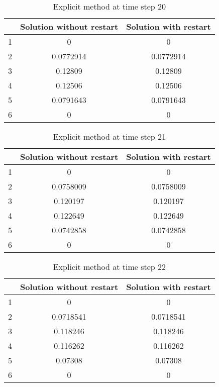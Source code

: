 \documentclass[a4paper,12pt]{article}
\begin{document}
\begin{table}[H]
\begin{center}
\begin{tabular}{ | c | c | c | }
  \hline
  & Solution without restart & Solution with restart \\
 \hline
 1  &  0 & 0     \\
  \hline
 2  &  0.0772914 & 0.0772914   \\
  \hline
 3  &  0.12809 & 0.12809   \\
  \hline
 4  &  0.12506 & 0.12506   \\
  \hline
 5  &   0.0791643 & 0.0791643   \\
  \hline
 6  &   0 & 0   \\
  \hline
\end{tabular}
\end{center}
\caption{Explicit method at time step 20}
\end{table}

\begin{table}[H]
\begin{center}
\begin{tabular}{ | c | c | c | }
  \hline
  & Solution without restart & Solution with restart \\
 \hline
 1  &  0 &  0  \\
  \hline
 2  &  0.0758009 &  0.0758009  \\
  \hline
 3  &  0.120197 &  0.120197  \\
  \hline
 4  &  0.122649 &  0.122649  \\
  \hline
 5  &  0.0742858 & 0.0742858   \\
  \hline
 6  &   0 &  0  \\
  \hline
\end{tabular}
\end{center}
\caption{Explicit method at time step 21}
\end{table}

\begin{table}[H]
\begin{center}
\begin{tabular}{ | c | c | c | }
  \hline
  & Solution without restart & Solution with restart \\
 \hline
 1  &  0 & 0   \\
  \hline
 2  &  0.0718541 & 0.0718541   \\
  \hline
 3  &  0.118246 & 0.118246   \\
  \hline
 4  &  0.116262 &  0.116262  \\
  \hline
 5  &  0.07308 &  0.07308  \\
  \hline
 6  &   0 & 0   \\
  \hline
\end{tabular}
\end{center}
\caption{Explicit method at time step 22}
\end{table}
\end{document}
